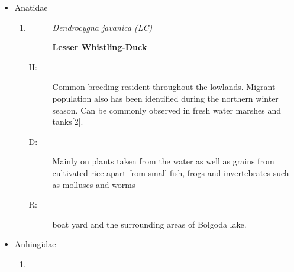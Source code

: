 \begin{itemize}
\begin{enumerate}
\begin{description}
boat yard and the surrounding areas of Bolgoda lake.%
\end{description}%
\item%
\begin{description}%
\item[]%
\textit{Halcyon smyrnensis (LC)}%
\item[]%
\textbf{White{-}Brested Kingfisher/White{-}Throated Kingfisher}%
\end{description}%
\begin{description}%
\item[H: ]%
Common breeding resident found throughout the island. Can be observed in open areas, cultivation, gardens and wetlands. The most common Kingfisher species in Sri Lanka{[}2{]}.%
\item[D: ]%
Has a diverse range of prey, including large crustaceans, insects, earthworms, rodents, lizards, snakes, fish, and frogs. Occationally preys on small birds.%
\item[R: ]%
Near the university playground, hostels and fairly common in boat yard and Kaju Kele.%
\end{description}%
\end{enumerate}%
\item%
Anatidae%
\begin{enumerate}%
\item%
\begin{description}%
\item[]%
\textit{Dendrocygna javanica (LC)}%
\item[]%
\textbf{Lesser Whistling{-}Duck}%
\end{description}%
\begin{description}%
\item[H: ]%
Common breeding resident throughout the lowlands. Migrant population also has been identified during the northern winter season. Can be commonly observed in fresh water marshes and tanks{[}2{]}.%
\item[D: ]%
Mainly on plants taken from the water as well as grains from cultivated rice apart from small fish, frogs and invertebrates such as molluscs and worms%
\item[R: ]%
boat yard and the surrounding areas of Bolgoda lake.%
\end{description}%
\end{enumerate}%
\item%
Anhingidae%
\begin{enumerate}%
\item%
\begin{description}%

\end{description}
\end{enumerate}
\end{itemize}
